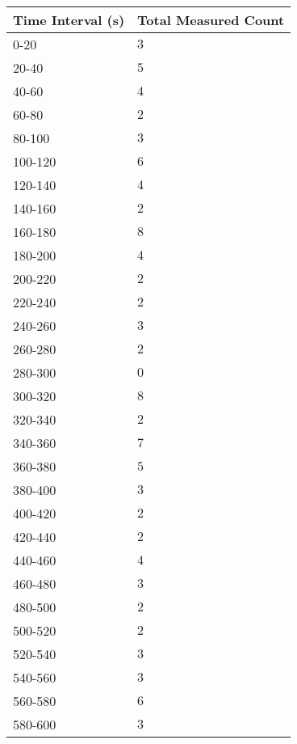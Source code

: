 \begin{tabular}{| p{} | p{}|}\hline
Time Interval (s) & Total Measured Count\\
\hline
0-20 & $3$\\
20-40 & $5$\\
40-60 & $4$\\
60-80 & $2$\\
80-100 & $3$\\
100-120 & $6$\\
120-140 & $4$\\
140-160 & $2$\\
160-180 & $8$\\
180-200 & $4$\\
200-220 & $2$\\
220-240 & $2$\\
240-260 & $3$\\
260-280 & $2$\\
280-300 & $0$\\
300-320 & $8$\\
320-340 & $2$\\
340-360 & $7$\\
360-380 & $5$\\
380-400 & $3$\\
400-420 & $2$\\
420-440 & $2$\\
440-460 & $4$\\
460-480 & $3$\\
480-500 & $2$\\
500-520 & $2$\\
520-540 & $3$\\
540-560 & $3$\\
560-580 & $6$\\
580-600 & $3$\\
\hline
\end{tabular}\quad
